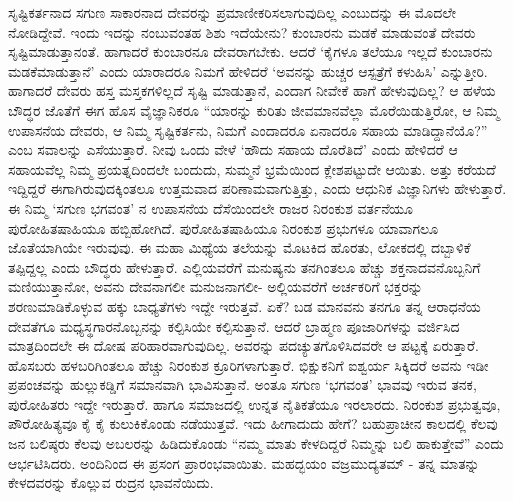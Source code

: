 ಸೃಷ್ಟಿಕರ್ತನಾದ ಸಗುಣ ಸಾಕಾರನಾದ ದೇವರನ್ನು ಪ್ರಮಾಣೀಕರಿಸಲಾಗುವುದಿಲ್ಲ ಎಂಬುದನ್ನು ಈ ಮೊದಲೇ ನೋಡಿದ್ದೇವೆ. ಇಂದು ಇದನ್ನು ನಂಬುವಂತಹ ಶಿಶು ಇದೆಯೇನು? ಕುಂಬಾರನು ಮಡಕೆ ಮಾಡುವಂತೆ ದೇವರು ಸೃಷ್ಟಿಮಾಡುತ್ತಾನಂತೆ. ಹಾಗಾದರೆ ಕುಂಬಾರನೂ ದೇವರಾಗಬೇಕು. ಆದರೆ ‘ಕೈಗಳೂ ತಲೆಯೂ ಇಲ್ಲದೆ ಕುಂಬಾರನು ಮಡಕೆಮಾಡುತ್ತಾನೆ’ ಎಂದು ಯಾರಾದರೂ ನಿಮಗೆ ಹೇಳಿದರೆ ‘ಅವನನ್ನು ಹುಚ್ಚರ ಆಸ್ಪತ್ರೆಗೆ ಕಳುಹಿಸಿ’ ಎನ್ನುತ್ತೀರಿ. ಹಾಗಾದರೆ ದೇವರು ಹಸ್ತ ಮಸ್ತಕಗಳಿಲ್ಲದೆ ಸೃಷ್ಟಿ ಮಾಡುತ್ತಾನೆ, ಎಂದಾಗ ನೀವೇಕೆ ಹಾಗೆ ಹೇಳುವುದಿಲ್ಲ? ಆ ಹಳೆಯ ಬೌದ್ಧರ ಜೊತೆಗೆ ಈಗ ಹೊಸ ವೈಜ್ಞಾನಿಕರೂ “ಯಾರನ್ನು ಕುರಿತು ಜೀವಮಾನವೆಲ್ಲಾ ಮೊರೆಯಿಡುತ್ತಿರೋ, ಆ ನಿಮ್ಮ ಉಪಾಸನೆಯ ದೇವರು, ಆ ನಿಮ್ಮ ಸೃಷ್ಟಿಕರ್ತನು, ನಿಮಗೆ ಎಂದಾದರೂ ಏನಾದರೂ ಸಹಾಯ ಮಾಡಿದ್ದಾನೆಯೊ?” ಎಂಬ ಸವಾಲನ್ನು ಎಸೆಯುತ್ತಾರೆ. ನೀವು ಒಂದು ವೇಳೆ ‘ಹೌದು ಸಹಾಯ ದೊರೆತಿದೆ’ ಎಂದು ಹೇಳಿದರೆ ಆ ಸಹಾಯವೆಲ್ಲ ನಿಮ್ಮ ಪ್ರಯತ್ನದಿಂದಲೇ ಬಂದುದು, ಸುಮ್ಮನೆ ಭ್ರಮೆಯಿಂದ ಕ್ಲೇಶಪಟ್ಟುದೇ ಆಯಿತು. ಅತ್ತು ಕರೆಯದೆ ಇದ್ದಿದ್ದರೆ ಈಗಾಗಿರುವುದಕ್ಕಿಂತಲೂ ಉತ್ತಮವಾದ ಪರಿಣಾಮವಾಗುತ್ತಿತ್ತು, ಎಂದು ಆಧುನಿಕ ವಿಜ್ಞಾನಿಗಳು ಹೇಳುತ್ತಾರೆ. ಈ ನಿಮ್ಮ ‘ಸಗುಣ ಭಗವಂತ’ ನ ಉಪಾಸನೆಯ ದೆಸೆಯಿಂದಲೇ ರಾಜರ ನಿರಂಕುಶ ವರ್ತನೆಯೂ ಪುರೋಹಿತಷಾಹಿಯೂ ಹಬ್ಬಿಹೋಗಿದೆ. ಪುರೋಹಿತಷಾಹಿಯೂ ನಿರಂಕುಶ ಪ್ರಭುಗಳೂ ಯಾವಾಗಲೂ ಜೊತೆಯಾಗಿಯೇ ಇರುವುವು. ಈ ಮಹಾ ಮಿಥ್ಯೆಯ ತಲೆಯನ್ನು ಮೊಟಕಿದ ಹೊರತು, ಲೋಕದಲ್ಲಿ ದಬ್ಬಾಳಿಕೆ ತಪ್ಪಿದ್ದಲ್ಲ ಎಂದು ಬೌದ್ಧರು ಹೇಳುತ್ತಾರೆ. ಎಲ್ಲಿಯವರೆಗೆ ಮನುಷ್ಯನು ತನಗಿಂತಲೂ ಹೆಚ್ಚು ಶಕ್ತನಾದವನೊಬ್ಬನಿಗೆ ಮಣಿಯುತ್ತಾನೋ, ಅವನು ದೇವನಾಗಲೀ ಮನುಜನಾಗಲೀ- ಅಲ್ಲಿಯವರೆಗೆ ಅರ್ಚಕರಿಗೆ ಭಕ್ತರನ್ನು ಶರಣುಮಾಡಿಕೊಳ್ಳುವ ಹಕ್ಕು ಬಾಧ್ಯತೆಗಳು ಇದ್ದೇ ಇರುತ್ತವೆ. ಏಕೆ? ಬಡ ಮಾನವನು ತನಗೂ ತನ್ನ ಆರಾಧನೆಯ ದೇವತೆಗೂ ಮಧ್ಯಸ್ಥಗಾರನೊಬ್ಬನನ್ನು ಕಲ್ಪಿಸಿಯೇ ಕಲ್ಪಿಸುತ್ತಾನೆ. ಆದರೆ ಬ್ರಾಹ್ಮಣ ಪೂಜಾರಿಗಳನ್ನು ವರ್ಜಿಸಿದ ಮಾತ್ರದಿಂದಲೇ ಈ ದೋಷ ಪರಿಹಾರವಾಗುವುದಿಲ್ಲ. ಅವರನ್ನು ಪದಚ್ಯುತಗೊಳಿಸಿದವರೇ ಆ ಪಟ್ಟಕ್ಕೆ ಏರುತ್ತಾರೆ. ಹೊಸಬರು ಹಳಬರಿಗಿಂತಲೂ ಹೆಚ್ಚು ನಿರಂಕುಶ ಕ್ರೂರಿಗಳಾಗುತ್ತಾರೆ. ಭಿಕ್ಷುಕನಿಗೆ ಐಶ್ವರ್ಯ ಸಿಕ್ಕಿದರೆ ಅವನು ಇಡೀ ಪ್ರಪಂಚವನ್ನು ಹುಲ್ಲುಕಡ್ಡಿಗೆ ಸಮಾನವಾಗಿ ಭಾವಿಸುತ್ತಾನೆ. ಅಂತೂ ಸಗುಣ ‘ಭಗವಂತ’ ಭಾವವು ಇರುವ ತನಕ, ಪುರೋಹಿತರು ಇದ್ದೇ ಇರುತ್ತಾರೆ. ಹಾಗೂ ಸಮಾಜದಲ್ಲಿ ಉನ್ನತ ನೈತಿಕತೆಯೂ ಇರಲಾರದು. ನಿರಂಕುಶ ಪ್ರಭುತ್ವವೂ, ಪೌರೋಹಿತ್ಯವೂ ಕೈ ಕೈ ಕುಲುಕಿಕೊಂಡು ನಡೆಯುತ್ತವೆ. ಇದು ಹೀಗಾದುದು ಹೇಗೆ? ಬಹುಪ್ರಾಚೀನ ಕಾಲದಲ್ಲಿ ಕೆಲವು ಜನ ಬಲಿಷ್ಠರು ಕೆಲವು ಅಬಲರನ್ನು ಹಿಡಿದುಕೊಂಡು “ನಮ್ಮ ಮಾತು ಕೇಳದಿದ್ದರೆ ನಿಮ್ಮನ್ನು ಬಲಿ ಹಾಕುತ್ತೇವೆ” ಎಂದು ಆರ್ಭಟಿಸಿದರು. ಅಂದಿನಿಂದ ಈ ಪ್ರಸಂಗ ಪ್ರಾರಂಭವಾಯಿತು. ಮಹದ್ಭಯಂ ವಜ್ರಮುದ್ಯತಮ್​ - ತನ್ನ ಮಾತನ್ನು ಕೇಳದವರನ್ನು ಕೊಲ್ಲುವ ರುದ್ರನ ಭಾವನೆಯಿದು.

